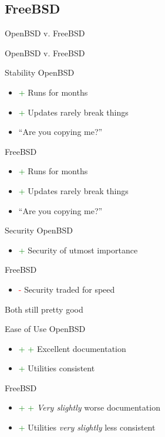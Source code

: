 \documentclass{beamer}
\newcommand{\good}{\textcolor{green}{+ }}
\newcommand{\bad}{\textcolor{red}{- }}
\begin{document}
		\subsection{FreeBSD}
			\begin{frame}{OpenBSD v. FreeBSD}
				\begin{center}
					OpenBSD v. FreeBSD
				\end{center}
			\end{frame}
			\begin{frame}{Stability}
				OpenBSD
				\begin{itemize}
					\item \good Runs for months
					\item \good Updates rarely break things
					\item ``Are you copying me?''
				\end{itemize}
				FreeBSD
				\begin{itemize}
					\item \good Runs for months
					\item \good Updates rarely break things
					\item ``Are you copying me?''
				\end{itemize}
			\end{frame}
			\begin{frame}{Security}
				OpenBSD
				\begin{itemize}
					\item \good Security of utmost importance
				\end{itemize}
				FreeBSD
				\begin{itemize}
					\item \bad Security traded for speed
				\end{itemize}
				Both still pretty good
			\end{frame}
			\begin{frame}{Ease of Use}
				OpenBSD
				\begin{itemize}
					\item \good \good Excellent documentation
					\item \good Utilities consistent
				\end{itemize}
				FreeBSD
				\begin{itemize}
					\item \good \good \textsl{Very slightly} worse documentation
					\item \good Utilities \textsl{very slightly} less consistent
				\end{itemize}
			\end{frame}
\end{document}
